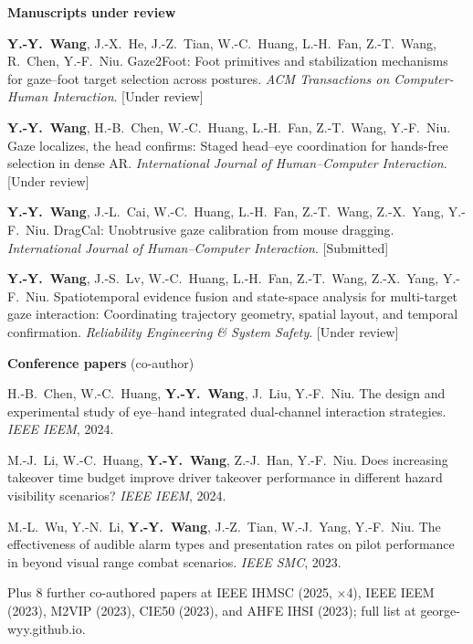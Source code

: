 \documentclass[10pt,a4paper]{article}
\newcommand{\me}{\textbf{Y.-Y.~Wang}}
\newcommand{\status}[1]{{\color{accent}[#1]}}
\begin{document}
\textbf{Manuscripts under review}
\begin{enumerate}[label={[M\arabic*]}]
  \item \me, J.-X.~He, J.-Z.~Tian, W.-C.~Huang, L.-H.~Fan, Z.-T.~Wang, R.~Chen, Y.-F.~Niu.
    Gaze2Foot: Foot primitives and stabilization mechanisms for gaze--foot target selection across postures.
    \textit{ACM Transactions on Computer-Human Interaction}. \status{Under review}
  \item \me, H.-B.~Chen, W.-C.~Huang, L.-H.~Fan, Z.-T.~Wang, Y.-F.~Niu.
    Gaze localizes, the head confirms: Staged head--eye coordination for hands-free selection in dense AR.
    \textit{International Journal of Human--Computer Interaction}. \status{Under review}
  \item \me, J.-L.~Cai, W.-C.~Huang, L.-H.~Fan, Z.-T.~Wang, Z.-X.~Yang, Y.-F.~Niu.
    DragCal: Unobtrusive gaze calibration from mouse dragging.
    \textit{International Journal of Human--Computer Interaction}. \status{Submitted}
  \item \me, J.-S.~Lv, W.-C.~Huang, L.-H.~Fan, Z.-T.~Wang, Z.-X.~Yang, Y.-F.~Niu.
    Spatiotemporal evidence fusion and state-space analysis for multi-target gaze interaction: Coordinating trajectory geometry, spatial layout, and temporal confirmation.
    \textit{Reliability Engineering \& System Safety}. \status{Under review}
\end{enumerate}

\textbf{Conference papers} {\small\color{muted}(co-author)}
\begin{enumerate}[label={[C\arabic*]}]
  \item H.-B.~Chen, W.-C.~Huang, \me, J.~Liu, Y.-F.~Niu.
    The design and experimental study of eye--hand integrated dual-channel interaction strategies. \textit{IEEE IEEM}, 2024.
  \item M.-J.~Li, W.-C.~Huang, \me, Z.-J.~Han, Y.-F.~Niu.
    Does increasing takeover time budget improve driver takeover performance in different hazard visibility scenarios? \textit{IEEE IEEM}, 2024.
  \item M.-L.~Wu, Y.-N.~Li, \me, J.-Z.~Tian, W.-J.~Yang, Y.-F.~Niu.
    The effectiveness of audible alarm types and presentation rates on pilot performance in beyond visual range combat scenarios. \textit{IEEE SMC}, 2023.
  \item[] {\small\color{muted} Plus 8 further co-authored papers at IEEE IHMSC (2025, $\times$4), IEEE IEEM (2023), M2VIP (2023), CIE50 (2023), and AHFE IHSI (2023); full list at george-wyy.github.io.}
\end{enumerate}
\end{document}
